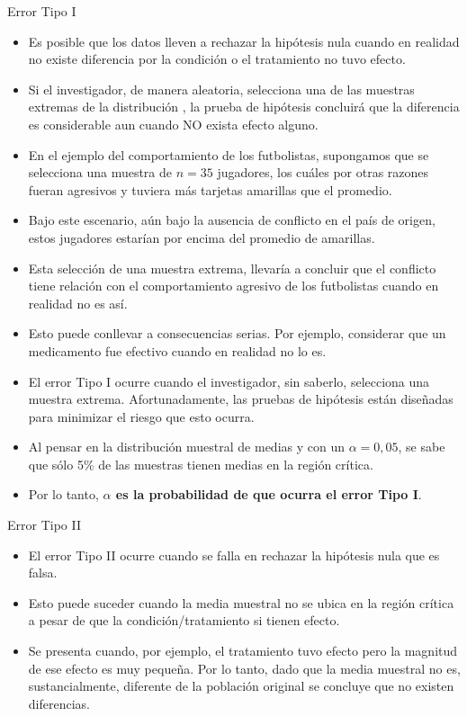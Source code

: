 \documentclass{beamer}
\begin{document}
\begin{frame}{Error Tipo I}
	\begin{itemize}
		\justifying
\item Es posible que los datos lleven a rechazar la hipótesis nula cuando en realidad no existe diferencia por la condición o el tratamiento no tuvo efecto.
\item Si el investigador, de manera aleatoria, selecciona una de las muestras extremas de la distribución , la prueba de hipótesis concluirá que la diferencia es considerable aun cuando NO exista efecto alguno. 
\item En el ejemplo del comportamiento de los futbolistas, supongamos que se selecciona una muestra de $n=35$ jugadores, los cuáles por otras razones fueran agresivos  y tuviera más tarjetas amarillas que el promedio.
\item Bajo este escenario, aún bajo la ausencia de conflicto en el país de origen, estos jugadores estarían por encima del promedio de amarillas.
	\end{itemize}
\end{frame}

\begin{frame}
	\begin{itemize}
		\justifying
\item Esta selección de una muestra extrema, llevaría a concluir que el conflicto tiene relación con el comportamiento agresivo de los futbolistas cuando en realidad no es así.
\item Esto puede conllevar a consecuencias serias. Por ejemplo, considerar que un medicamento fue efectivo cuando en realidad no lo es.
\item El error Tipo I ocurre cuando el investigador, sin saberlo, selecciona una muestra extrema. Afortunadamente, las pruebas de hipótesis están diseñadas para minimizar el riesgo que esto ocurra.
\item Al pensar en la distribución muestral de medias y con un $\alpha=0,05$, se sabe que sólo 5\% de las muestras tienen medias en la región crítica.
\item Por lo tanto, {\bf $\alpha$ es la probabilidad de que ocurra el error Tipo I}. 
	\end{itemize}
\end{frame}

\begin{frame}{Error Tipo II}
	\begin{itemize}
		\justifying
\item El error Tipo II ocurre cuando se falla en rechazar la hipótesis nula que es falsa.
\item Esto puede suceder cuando la media muestral no se ubica en la región crítica a pesar de que la condición/tratamiento si tienen efecto.
\item Se presenta cuando, por ejemplo, el tratamiento tuvo efecto pero la magnitud de ese efecto es muy pequeña. Por lo tanto, dado que la media muestral no es, sustancialmente, diferente de la población original se concluye que no existen diferencias.

	\end{itemize}
\end{frame}
\end{document}
